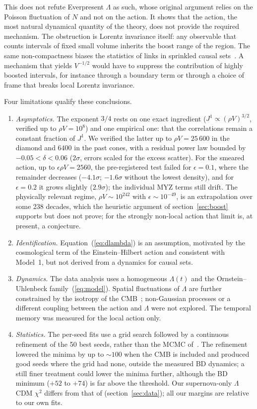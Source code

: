 \documentclass{iopjournal}
\newcommand{\eref}[1]{(\ref{#1})}
\newcommand{\rhoV}{\rho V}
\newcommand{\Jone}{J^{1}}
\begin{document}
This does not refute Everpresent $\Lambda$ as such, whose original argument
relies on the Poisson fluctuation of $N$ and not on the action. It shows that
the action, the most natural dynamical quantity of the theory, does not
provide the required mechanism. The obstruction is Lorentz invariance itself:
any observable that counts intervals of fixed small volume inherits the boost
range of the region. The same non-compactness biases the statistics of links
in sprinkled causal sets~\cite{Boguna2026}. A mechanism that yields $V^{-1/2}$
would have to suppress the contribution of highly boosted intervals, for
instance through a boundary term or through a choice of frame that breaks
local Lorentz invariance.

Four limitations qualify these conclusions.
\begin{enumerate}
\item \emph{Asymptotics.} The exponent $3/4$ rests on one exact ingredient
($\Jone\propto(\rhoV)^{3/2}$, verified up to $\rhoV=10^8$) and one empirical
one: that the correlations remain a constant fraction of $\Jone$. We verified
the latter up to $\rhoV=25\,600$ in the diamond and $6400$ in the past cones,
with a residual power law bounded by $-0.05<\delta<0.06$ ($2\sigma$, errors
scaled for the excess scatter). For the
smeared action, up to $\epsilon\rhoV=2560$, the pre-registered test failed
for $\epsilon=0.1$, where the remainder decreases ($-4.1\sigma$; $-1.6\sigma$
without the lowest density), and for $\epsilon=0.2$ it grows slightly
($2.9\sigma$); the individual MYZ terms still drift. The physically relevant
regime, $\rhoV\sim10^{242}$ with $\epsilon\sim10^{-49}$, is an extrapolation
over some 238 decades, which the heuristic argument of
section~\ref{sec:boost} supports but does not prove; for the strongly
non-local action that limit is, at present, a conjecture.
\item \emph{Identification.} Equation~\eref{eq:dlambda} is an assumption,
motivated by the cosmological term of the Einstein--Hilbert action and
consistent with Model~1, but not derived from a dynamics for causal sets.
\item \emph{Dynamics.} The data analysis uses a homogeneous $\Lambda(t)$ and
the Ornstein--Uhlenbeck family~\eref{eq:model}. Spatial fluctuations of
$\Lambda$ are further constrained by the isotropy of the
CMB~\cite{Barrow2007}; non-Gaussian processes or a different coupling
between the action and $\Lambda$ were not explored. The temporal memory was
measured for the local action only.
\item \emph{Statistics.} The per-seed fits use a grid search followed by a
continuous refinement of the 50 best seeds, rather than the MCMC
of~\cite{Das2024}. The refinement lowered the minima by up to $\sim100$ when
the CMB is included and produced good seeds where the grid had none, outside
the measured BD dynamics; a still finer treatment could lower the minima
further, although the BD minimum ($+52$ to $+74$) is far above the threshold.
Our
supernova-only $\Lambda$CDM $\chi^2$ differs from that of \cite{Das2024}
(section~\ref{sec:data}); all our margins are relative to our own fits.
\end{enumerate}
\end{document}
